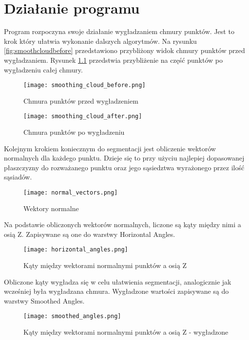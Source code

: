 	\chapter{Działanie programu}
	Program rozpoczyna swoje działanie wygładzaniem chmury punktów. Jest to krok który ułatwia wykonanie dalszych algorytmów. Na rysunku \ref{fig:smoothcloudbefore} przedstawiono przybliżony widok chmury punktów przed wygładzaniem. Rysunek \ref{fig:smoothcloudafter} przedstwia przybliżenie na część punktów po wygładzeniu całej chmury.\\
	\begin{figure}[!htb]%
		\begin{minipage}{0.48\textwidth}
			\texttt{[image: smoothing\_cloud\_before.png]}
			\caption{Chmura punktów przed wygładzeniem}
			\label{fig:smoothcloudbefore}
		\end{minipage}\hfill
		\begin{minipage}{0.48\textwidth}
			\texttt{[image: smoothing\_cloud\_after.png]}
			\caption{Chmura punktów po wygładzeniu}
			\label{fig:smoothcloudafter}
		\end{minipage}\hfill
	\end{figure}

	Kolejnym krokiem koniecznym do segmentacji jest obliczenie wektorów normalnych dla każdego punktu. Dzieje się to przy użyciu najlepiej dopasowanej płaszczyzny do rozważanego punktu oraz jego sąsiedztwa wyrażonego przez ilość sąsiadów.\\
	\newpage
	\begin{figure}[h!]
	\centering
	\texttt{[image: normal\_vectors.png]}
	\caption{Wektory normalne}
	\label{fig:normalvecs}
	\end{figure}
	
	Na podstawie obliczonych wektorów normalnych, liczone są kąty między nimi a osią Z. Zapisywane są one do warstwy Horizontal Angles.\\
	\begin{figure}[h!]
	\centering
	\texttt{[image: horizontal\_angles.png]}
	\caption{Kąty między wektorami normalnymi punktów a osią Z}
	\label{fig:angles}
	\end{figure}
	
	Obliczone kąty wygładza się w celu ułatwienia segmentacji, analogicznie jak wcześniej była wygładzana chmura. Wygładzone wartości zapisywane są do warstwy Smoothed Angles.\\
	\newpage
	\begin{figure}[h!]
	\centering
	\texttt{[image: smoothed\_angles.png]}
	\caption{Kąty między wektorami normalnymi punktów a osią Z - wygładzone}
	\label{fig:smoothedangles}
	\end{figure}
	
